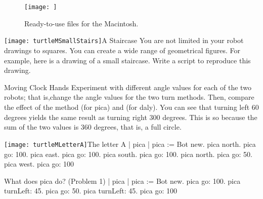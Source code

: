 \documentclass[a4paper,10pt,twoside]{book}
\begin{document}
    \sloppy
\fi

\chapter{}\label{cha:}

\begin{figure}[h]
	\centerline{\texttt{[image: ]}}
	\caption{Ready-to-use files for the Macintosh.  
	\label{fig:macfiles}}
\end{figure}

\begin{exofigwithsize}[0.5]{\texttt{[image: turtleMSmallStairs]}}{A Staircase}\label{xp:letterA}
You are not limited in your robot drawings to squares. You can create a wide range of geometrical figures.
For example, here is a drawing of a small staircase. Write a script to reproduce this drawing. 
\end{exofigwithsize}

\begin{exonofigtitle}{Moving Clock Hands}
Experiment with different angle values for each of the two robots; that is,change the angle values for the two turn 
methods. Then, compare the effect of the method  (for pica) and  (for daly). 
You can see that turning left 60 degrees yields the same result as turning right 300 degrees. This is so because 
the sum of the two values is 360 degrees, that is, a full circle. 
\end{exonofigtitle}

\begin{scriptfigwithsize}[0.4]{\texttt{[image: turtleMLetterA]}}{The letter A}\label{scr:letterA}
	| pica | 
	pica := Bot new. 
	pica north. 
	pica go: 100. 
	pica east. 
	pica go: 100. 
	pica south. 
	pica go: 100. 
	pica north. 
	pica go: 50. 
	pica west. 
	pica go: 100
\end{scriptfigwithsize}

\begin{script}[myster1]{What does pica do? (Problem 1)}
	| pica | 
	pica := Bot new. 
	pica go: 100. 
	pica turnLeft: 45. 
	pica go: 50. 
	pica turnLeft: 45. 
	pica go: 100 
\end{script}



\ifx\wholebook\relax\else
    
\end{document}
